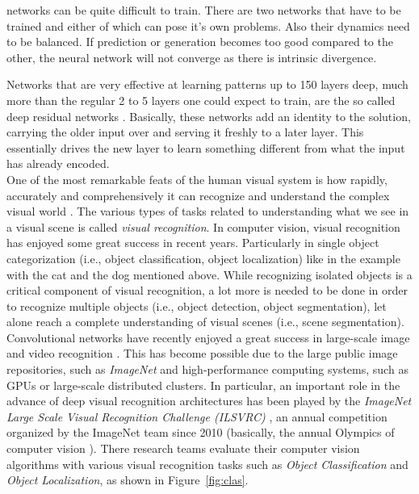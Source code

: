 \documentclass[12pt,a4paper,table,dvipsnames,tikz]{report}
\newcommand{\term}{\textit}
\newcommand{\acronym}{\MakeUppercase}
\newcommand{\bl}[1]{{\hypersetup{linkcolor=blue}#1}}
\begin{document}
	networks can be quite difficult to train. There are two networks that have to be 
	trained and either of which can pose it’s own problems. Also their dynamics need 
	to be balanced. If prediction or generation becomes too good compared to the other, 
	the neural network will not converge as there is intrinsic divergence.
	\par
	Networks that are very effective at learning patterns up to 150 layers deep, much 
	more than the regular 2 to 5 layers one could expect to train, are the so called 
	deep residual networks \citep{He_resnet}. Basically, these networks add an identity 
	to the solution, carrying the older input over and serving it freshly to a later 
	layer. This essentially drives the new layer to learn something different from what 
	the input has already encoded. 
	\\
	
	One of the most remarkable feats of the human visual system is how rapidly, 
	accurately and comprehensively it can recognize and understand the complex visual 
	world \citep{Socher}. The various types of tasks related to understanding what 
	we see in a visual scene is called \term{visual recognition}. In computer vision, 
	visual recognition has enjoyed some great success in recent years. Particularly 
	in single object categorization (i.e., object classification, object localization) 
	like in the example with the cat and the dog mentioned above. 
	While recognizing isolated objects is a critical component of visual recognition, 
	a lot more is needed to be done in order to recognize multiple objects (i.e., 
	object detection, object segmentation), let alone reach a complete understanding 
	of visual scenes (i.e., scene segmentation).
	\\
	
	Convolutional networks have recently enjoyed a great success in large-scale image 
	and video recognition \citep{Simonyan_vgg}. This has become possible due to the large 
	public image repositories, such as \term{ImageNet} \citep{Deng} and high-performance 
	computing systems, such as \acronym{gpu}s or large-scale distributed clusters. In 
	particular, an important role in the advance of deep visual recognition architectures 
	has been played by the \term{ImageNet Large Scale Visual Recognition Challenge 
	(\acronym{ilsvrc})} \citep{Russakovsky}, an annual competition organized by the 
	ImageNet team since 2010 (basically, the annual Olympics of computer vision \citep{Deshpande}). 
	There research teams evaluate their computer vision algorithms with various visual 
	recognition tasks such as \term{Object Classification} and \term{Object Localization}, 
	as shown in Figure~\bl{\ref{fig:clas}}.
	\\
	
\end{document}
